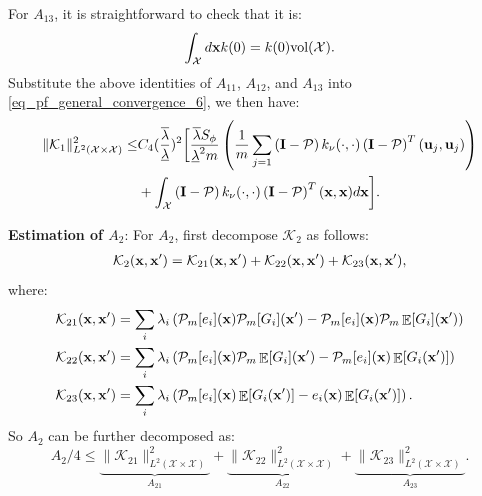 \documentclass[aos,preprint]{imsart}
\theoremstyle{plain}
\DeclareMathOperator{\E}{\mathbb E}
\newcommand{\CalX}{\mathcal X}
\newcommand{\CalP}{\mathcal P}
\newcommand{\CalK}{\mathcal K}
\newcommand{\Bx}{\bold x}
\newcommand{\BFx}{\bold x}
\newcommand{\Bu}{\bold u}
\theoremstyle{remark}
\begin{document}
\begin{appendix}
For $A_{13}$, it is straightforward to check that it is:
\[\int_\CalX d\BFx k(0)=k(0)\text{vol}(\CalX).\]
Substitute the above identities of $A_{11}$, $A_{12}$, and $A_{13}$ into \eqref{eq_pf_general_convergence_6}, we then have:
\begin{align}
\|\CalK_1\|_{L^2(\CalX\times\CalX)}^2\leq&C_4(\frac{\overline{\lambda}}{\underline{\lambda}})^2\bigg[\frac{\overline{\lambda}S_\phi}{\underline{\lambda}^2m}\left(\frac{1}{m}\sum_{j=1}\left(\bold{I}-\CalP\right)k_\nu(\cdot,\cdot)\left(\bold{I}-\CalP\right)^T(\Bu_j,\Bu_j)\right)\label{eq_pf_general_convergence_7}\\
    &+\int_\CalX\left(\bold{I}-\CalP\right)k_\nu(\cdot,\cdot)\left(\bold{I}-\CalP\right)^T(\BFx,\BFx)d\Bx\bigg].\nonumber
\end{align}

{\large \textbf{Estimation of $A_2$}}: For $A_2$, first decompose $\CalK_2$ as follows:
\begin{align*}
    \CalK_2(\Bx,\Bx')=\CalK_{21}(\Bx,\Bx')+\CalK_{22}(\Bx,\Bx')+\CalK_{23}(\Bx,\Bx'),
\end{align*}
where:
\begin{align*}
    &\CalK_{21}(\Bx,\Bx')=\sum_i\lambda_i\left(\CalP_m[e_i](\Bx)\CalP_m[G_i](\BFx')-\CalP_m[e_i](\BFx)\CalP_m\E[G_i](\BFx')\right)\\
    &\CalK_{22}(\Bx,\Bx')=\sum_i\lambda_i\left(\CalP_m[e_i](\BFx)\CalP_m\E[G_i](\BFx')-\CalP_m[e_i](\BFx)\E[G_i(\BFx')]\right)\\
    &\CalK_{23}(\Bx,\Bx')=\sum_i\lambda_i\left(\CalP_m[e_i](\BFx)\E[G_i(\BFx')]-e_i(\BFx)\E[G_i(\BFx')]\right).
\end{align*}
So $A_2$ can be further decomposed as:
\begin{equation}
    A_2/4\leq \underbrace{\|\CalK_{21}\|_{L^2(\CalX\times\CalX)}^2}_{A_{21}}+\underbrace{\|\CalK_{22}\|_{L^2(\CalX\times\CalX)}^2}_{A_{22}}+\underbrace{\|\CalK_{23}\|_{L^2(\CalX\times\CalX)}^2}_{A_{23}}. \label{eq_pf_general_convergence_8}
\end{equation}


\end{appendix}
\end{document}
